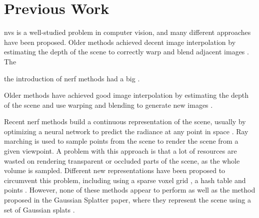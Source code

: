 \section{Previous Work}
\gls{nvs} is a well-studied problem in computer vision, and many different approaches have been proposed.
Older methods achieved decent image interpolation by estimating the depth of the scene to correctly warp and blend adjacent images \cite{zitnickHighqualityVideoView2004}.
The

the introduction of \gls{nerf} methods had a big  \cite{mildenhallNeRFRepresentingScenes2020a}.




Older methods have achieved good image interpolation by estimating the depth of the scene and use warping and blending to generate new images \cite{zitnickHighqualityVideoView2004}.

Recent \gls{nerf} methods build a continuous representation of the scene, usually by optimizing a neural network to predict the radiance at any point in space \cite{mildenhallNeRFRepresentingScenes2020a}.
Ray marching is used to sample points from the scene to render the scene from a given viewpoint.
A problem with this approach is that a lot of resources are wasted on rendering transparent or occluded parts of the scene, as the whole volume is sampled.
Different new representations have been proposed to circumvent this problem, including using a sparse voxel grid \cite{yuPlenoxelsRadianceFields2021a}, a hash table \cite{mullerInstantNeuralGraphics2022} and points \cite{xuPointNeRFPointbasedNeural2023}.
However, none of these methods appear to perform as well as the method proposed in the Gaussian Splatter paper, where they represent the scene using a set of Gaussian splats \cite{kerbl3DGaussianSplatting2023}.


